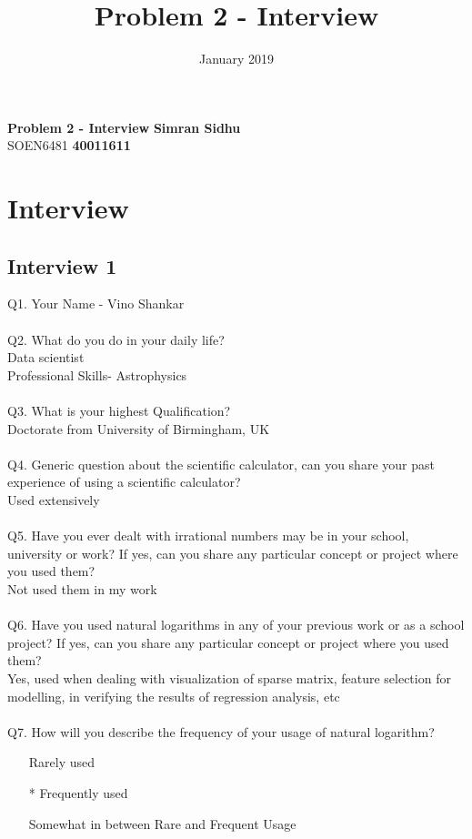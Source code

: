 \documentclass{article}
\title{Problem 2 - Interview}
\date{January 2019}
\makeatletter
\newcommand*{\radiobutton}{%
  \@ifstar{\@radiobutton0}{\@radiobutton1}%
}
\newcommand*{\@radiobutton}[1]{%
  \begin{tikzpicture}
    \pgfmathsetlengthmacro\radius{height("X")/2}
    \draw[radius=\radius] circle;
    \ifcase#1 \fill[radius=.6*\radius] circle;\fi
  \end{tikzpicture}%
}
\makeatother
\begin{document}
\noindent
\large\textbf{Problem 2 - Interview} \hfill \textbf{Simran Sidhu} \\
\normalsize SOEN6481 \hfill \textbf{40011611} \\
\section{Interview}
\subsection{Interview 1}
Q1. Your Name -  Vino Shankar\\\\
Q2. What do you do in your daily life?\\ 
Data scientist\\
Professional Skills- Astrophysics\\\\
Q3. What is your highest Qualification?\\
Doctorate from University of Birmingham, UK \\\\
Q4. Generic question about the scientific calculator, can you share your past experience of using a scientific calculator?\\
Used extensively\\\\
Q5. Have you ever dealt with irrational numbers may be in your school, university or work? If yes, can you share any particular concept or project where you used them?\\
Not used them in my work\\\\
Q6. Have you used natural logarithms in any of your previous work or as a school project? If yes, can you share any particular concept or project where you used them?\\
Yes, used when dealing with visualization of sparse matrix, feature selection for modelling, in verifying the results of regression analysis, etc\\\\
Q7. How will you describe the frequency of your usage of natural logarithm?
\begin{itemize}
\item[\radiobutton] Rarely used
\item[\radiobutton*] Frequently used
\item[\radiobutton] Somewhat in between Rare and Frequent Usage
\end{itemize}
\end{document}
